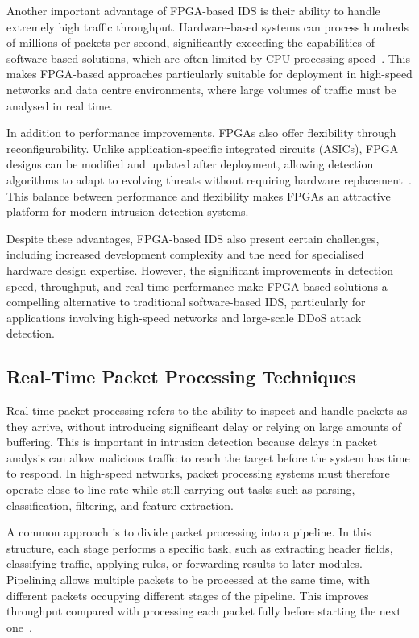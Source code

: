 Another important advantage of FPGA-based IDS is their ability to handle extremely high traffic throughput. Hardware-based systems can process hundreds of millions of packets per second, significantly exceeding the capabilities of software-based solutions, which are often limited by CPU processing speed~\cite{nagy_detecting_2018}. This makes FPGA-based approaches particularly suitable for deployment in high-speed networks and data centre environments, where large volumes of traffic must be analysed in real time.

In addition to performance improvements, FPGAs also offer flexibility through reconfigurability. Unlike application-specific integrated circuits (ASICs), FPGA designs can be modified and updated after deployment, allowing detection algorithms to adapt to evolving threats without requiring hardware replacement~\cite{shanmugam_denial_2019}. This balance between performance and flexibility makes FPGAs an attractive platform for modern intrusion detection systems.

Despite these advantages, FPGA-based IDS also present certain challenges, including increased development complexity and the need for specialised hardware design expertise. However, the significant improvements in detection speed, throughput, and real-time performance make FPGA-based solutions a compelling alternative to traditional software-based IDS, particularly for applications involving high-speed networks and large-scale DDoS attack detection.

\subsection{Real-Time Packet Processing Techniques}
Real-time packet processing refers to the ability to inspect and handle packets as they arrive, without introducing significant delay or relying on large amounts of buffering. This is important in intrusion detection because delays in packet analysis can allow malicious traffic to reach the target before the system has time to respond. In high-speed networks, packet processing systems must therefore operate close to line rate while still carrying out tasks such as parsing, classification, filtering, and feature extraction.

A common approach is to divide packet processing into a pipeline. In this structure, each stage performs a specific task, such as extracting header fields, classifying traffic, applying rules, or forwarding results to later modules. Pipelining allows multiple packets to be processed at the same time, with different packets occupying different stages of the pipeline. This improves throughput compared with processing each packet fully before starting the next one~\cite{nguyen_real-time_2005, attig_400_2011}.

